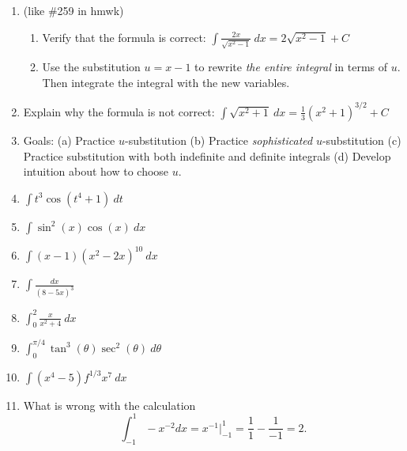 \documentclass[11pt,fleqn]{article}
\begin{document}
\vspace*{-0.7in}

\begin{center}
  \Large{}
  \end{center}
\begin{enumerate}
\item (like \#259 in hmwk) 
	\begin{enumerate}
	\item Verify that the formula is correct: $\displaystyle{\int \frac{2x}{\sqrt{x^2-1}} \: dx = 2\sqrt{x^2-1}+C}$
	\vfill
	\item Use the substitution $u=x-1$ to rewrite \emph{the entire integral} in terms of $u.$ Then integrate the integral with the new variables.
	\vfill
	\end{enumerate}
\item Explain why the formula is not correct: $\displaystyle{\int {\sqrt{x^2+1}} \: dx = \frac{1}{3}(x^2+1)^{3/2}+C}$
\vspace{1in}
\item Goals: (a) Practice $u$-substitution (b) Practice \emph{sophisticated} $u$-substitution (c) Practice substitution with both indefinite and definite integrals (d) Develop intuition about how to choose $u.$\\
\item $\displaystyle{\int t^3 \cos (t^4 +1)} \: dt$
\vfill
\item $\displaystyle{\int \sin^2(x) \cos(x)} \: dx$
\vfill
\newpage
\item $\displaystyle{\int (x-1)(x^2-2x)^{10}} \: dx$
\vfill
\item $\displaystyle{\int \frac{dx}{(8-5x)^3}} $
\vfill
\item $\displaystyle{\int_0^2 \frac{x}{x^2+4}} \: dx$
\vfill
\item $\displaystyle{\int_0^{\pi/4} \tan^3(\theta)\sec^2(\theta)} \: d\theta$
\vfill
\item $\displaystyle{\int (x^4 - 5)f^{1/3} x^7 \: dx}$
\vfill
\item What is wrong with the calculation $$\int_{-1}^1 -x^{-2} dx = x^{-1} \vert_{-1}^1=\frac{1}{1}-\frac{1}{-1}=2.$$
\end{enumerate}
\end{document}
